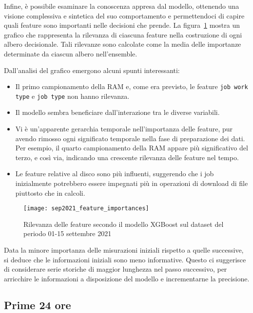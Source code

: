 Infine, è possibile esaminare la conoscenza appresa dal modello, ottenendo una
visione complessiva e sintetica del suo comportamento e permettendoci di
capire quali feature sono importanti nelle decisioni che prende. La
figura~\ref{fig:feature_importances} mostra un grafico che rappresenta la
rilevanza di ciascuna feature nella costruzione di ogni albero decisionale.
Tali rilevanze sono calcolate come la media delle importanze determinate da
ciascun albero nell'ensemble.

Dall'analisi del grafico emergono alcuni spunti interessanti:

\begin{itemize}
    \item Il primo campionamento della RAM e, come era previsto, le feature
        \verb|job work type| e \verb|job type| non hanno rilevanza.
    \item Il modello sembra beneficiare dall'interazione tra le diverse
        variabili.
    \item Vi è un'apparente gerarchia temporale nell'importanza delle feature,
        pur avendo rimosso ogni significato temporale nella fase di
        preparazione dei dati. Per esempio, il quarto campionamento della RAM
        appare più significativo del terzo, e così via, indicando una
        crescente rilevanza delle feature nel tempo.
    \item Le feature relative al disco sono più influenti, suggerendo che i
        job inizialmente potrebbero essere impegnati più in operazioni di
        download di file piuttosto che in calcoli.
\end{itemize}

\begin{figure}[!p]
    \centering
    \texttt{[image: sep2021\_feature\_importances]}
    \caption{Rilevanza delle feature secondo il 
    modello XGBoost sul dataset del periodo 01-15 settembre 2021}
    \label{fig:feature_importances}
\end{figure}

Data la minore importanza delle misurazioni iniziali rispetto a quelle
successive, si deduce che le informazioni iniziali sono meno informative.
Questo ci suggerisce di considerare serie storiche di maggior lunghezza nel
passo successivo, per arricchire le informazioni a disposizione del modello e
incrementarne la precisione.

\subsection{Prime 24 ore}

